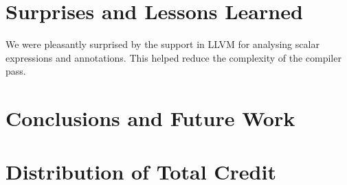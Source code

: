 \documentclass[letterpaper]{article}
\begin{document}
\section{Surprises and Lessons Learned}
We were pleasantly surprised by the support in LLVM for analysing scalar expressions and annotations.
This helped reduce the complexity of the compiler pass.

\section{Conclusions and Future Work}

\section{Distribution of Total Credit}



\end{document}

